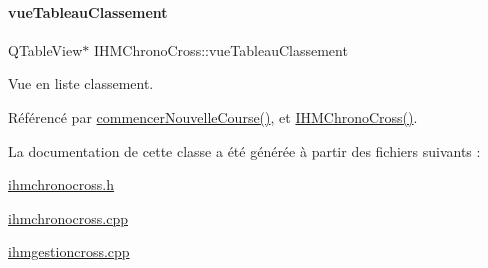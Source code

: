 \paragraph{\texorpdfstring{vue\+Tableau\+Classement}{vueTableauClassement}}
{\footnotesize\ttfamily Q\+Table\+View$\ast$ I\+H\+M\+Chrono\+Cross\+::vue\+Tableau\+Classement\hspace{0.3cm}{\ttfamily [private]}}



Vue en liste classement. 



Référencé par \hyperlink{class_i_h_m_chrono_cross_ab899a1d60c1f853b199abb937ae08e74}{commencer\+Nouvelle\+Course()}, et \hyperlink{class_i_h_m_chrono_cross_a479fc90733fba3e65fb06aa4a3adc02e}{I\+H\+M\+Chrono\+Cross()}.



La documentation de cette classe a été générée à partir des fichiers suivants \+:\begin{DoxyCompactItemize}
\item 
\hyperlink{ihmchronocross_8h}{ihmchronocross.\+h}\item 
\hyperlink{ihmchronocross_8cpp}{ihmchronocross.\+cpp}\item 
\hyperlink{ihmgestioncross_8cpp}{ihmgestioncross.\+cpp}\end{DoxyCompactItemize}
